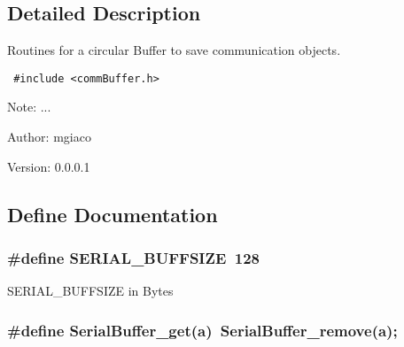 \subsection{Detailed Description}
Routines for a circular Buffer to save communication objects. 



\begin{Code}\begin{verbatim} #include <commBuffer.h> 
\end{verbatim}
\end{Code}

 \begin{Desc}
\item[Note:]... \end{Desc}
\begin{Desc}
\item[Author:]mgiaco \end{Desc}
\begin{Desc}
\item[Version:]0.0.0.1 \end{Desc}


\subsection{Define Documentation}
\hypertarget{group___serial_gd47283ecaa82d1fd076f405ba3172fc1}{
\subsubsection[{SERIAL\_\-BUFFSIZE}]{\setlength{\rightskip}{0pt plus 5cm}\#define SERIAL\_\-BUFFSIZE~128}}
\label{group___serial_gd47283ecaa82d1fd076f405ba3172fc1}


SERIAL\_\-BUFFSIZE in Bytes \hypertarget{group___serial_g557d78acaa759e408254896ba66cbb66}{
\subsubsection[{SerialBuffer\_\-get}]{\setlength{\rightskip}{0pt plus 5cm}\#define SerialBuffer\_\-get(a)~SerialBuffer\_\-remove(a);}}
\label{group___serial_g557d78acaa759e408254896ba66cbb66}


